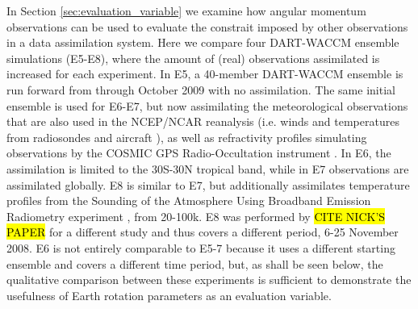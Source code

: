In Section \ref{sec:evaluation_variable} we examine how angular momentum observations can be used to evaluate the constrait imposed by other observations in a data assimilation system.  
Here we compare four DART-WACCM ensemble simulations (E5-E8), where the amount of (real) observations assimilated is increased for each experiment. 
In E5, a 40-member DART-WACCM ensemble is run forward from through October 2009 with no assimilation.  
The same initial ensemble is used for E6-E7, but now assimilating the meteorological observations that are also used in the NCEP/NCAR reanalysis (i.e. winds and temperatures from radiosondes and aircraft \citep{Saha2010}), as well as refractivity profiles simulating observations by the COSMIC GPS Radio-Occultation instrument \citep{Anthes2008}.
In E6, the assimilation is limited to the 30S-30N tropical band, while in E7 observations are assimilated globally. 
E8 is similar to E7, but additionally assimilates temperature profiles from the Sounding of the Atmosphere Using Broadband Emission Radiometry experiment \citep[SABER]{Russell2009}, from 20-100k.
E8 was performed by \hl{CITE NICK'S PAPER} for a different study and thus covers a different period, 6-25 November 2008.  
E6 is not entirely comparable to E5-7 because it uses a different starting ensemble and covers a different time period, but, as shall be seen below, the qualitative comparison between these experiments is sufficient to demonstrate the usefulness of Earth rotation parameters as an evaluation variable. 

